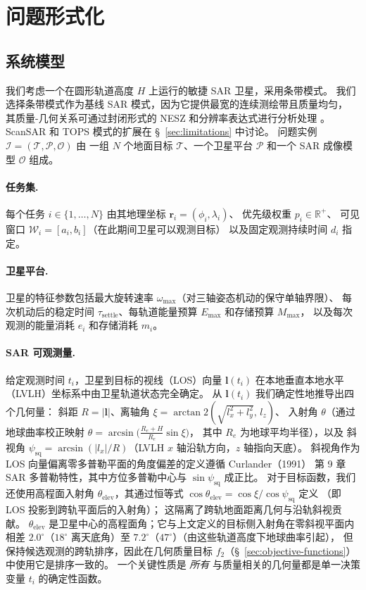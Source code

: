 \documentclass[preprint,12pt,authoryear]{elsarticle}
\begin{document}
\section{问题形式化}
\subsection{系统模型}\label{sec:system-model}
我们考虑一个在圆形轨道高度 $H$ 上运行的敏捷 SAR 卫星，采用条带模式。
我们选择条带模式作为基线 SAR 模式，因为它提供最宽的连续测绘带且质量均匀，
其质量-几何关系可通过封闭形式的 NESZ 和分辨率表达式进行分析处理 \citep{Curlander1991}。
ScanSAR 和 TOPS 模式的扩展在 \S~\ref{sec:limitations} 中讨论。
问题实例 $\mathcal{I} = (\mathcal{T}, \mathcal{P}, \mathcal{O})$ 由
一组 $N$ 个地面目标 $\mathcal{T}$、一个卫星平台 $\mathcal{P}$ 和一个 SAR 成像模型 $\mathcal{O}$ 组成。
\paragraph{任务集.}
每个任务 $i \in \{1,\ldots,N\}$ 由其地理坐标 $\mathbf{r}_i = (\phi_i, \lambda_i)$、
优先级权重 $p_i \in \mathbb{R}^+$、
可见窗口 $\mathcal{W}_i = [a_i, b_i]$（在此期间卫星可以观测目标）
以及固定观测持续时间 $d_i$ 指定。
\paragraph{卫星平台.}
卫星的特征参数包括最大旋转速率 $\omega_{\max}$（对三轴姿态机动的保守单轴界限）、
每次机动后的稳定时间 $\tau_{\text{settle}}$、每轨道能量预算 $E_{\max}$ 和存储预算 $M_{\max}$，
以及每次观测的能量消耗 $e_i$ 和存储消耗 $m_i$。
\paragraph{SAR 可观测量.}
给定观测时间 $t_i$，卫星到目标的视线（LOS）向量 $\mathbf{l}(t_i)$
在本地垂直本地水平（LVLH）坐标系中由卫星轨道状态完全确定。
从 $\mathbf{l}(t_i)$ 我们确定性地推导出四个几何量：
斜距 $R = |\mathbf{l}|$、离轴角 $\xi = \arctan2(\sqrt{l_x^2+l_y^2},\, l_z)$、
入射角 $\theta$（通过地球曲率校正映射 $\theta = \arcsin\big(\frac{R_e+H}{R_e}\sin\xi\big)$，
其中 $R_e$ 为地球平均半径），以及
斜视角 $\psi_{\text{sq}} = \arcsin(|l_x| / R)$（LVLH $x$ 轴沿轨方向，$z$ 轴指向天底）。
斜视角作为 LOS 向量偏离零多普勒平面的角度偏差的定义遵循 Curlander（1991）
第 9 章 SAR 多普勒特性，其中方位多普勒中心与 $\sin\psi_{\text{sq}}$ 成正比。
对于目标函数，我们还使用高程面入射角 $\theta_{\text{elev}}$，其通过恒等式
$\cos\theta_{\text{elev}} = \cos\xi / \cos\psi_{\text{sq}}$ 定义
（即 LOS 投影到跨轨平面后的入射角）；
这隔离了跨轨地面距离几何与沿轨斜视贡献。
$\theta_{\text{elev}}$ 是卫星中心的高程面角；它与上文定义的目标侧入射角在零斜视平面内相差 $2.0^\circ$（$18^\circ$ 离天底角）至 $7.2^\circ$（$47^\circ$）（由这些轨道高度下地球曲率引起），
但保持候选观测的跨轨排序，因此在几何质量目标 $f_2$（\S~\ref{sec:objective-functions}）中使用它是排序一致的。
一个关键性质是 \emph{所有} 与质量相关的几何量都是单一决策变量 $t_i$ 的确定性函数。
\end{document}
